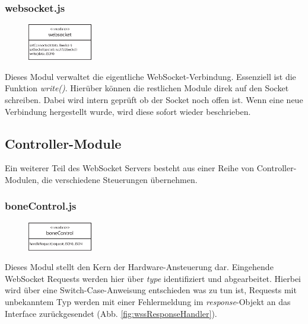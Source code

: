 \subsubsection{websocket.js}
\begin{figure}
  \vspace{-16pt}
  \centering
  \includegraphics[width = 0.25\textwidth]{dokumentation/images/apiWebsocket.eps}
\end{figure}

Dieses Modul verwaltet die eigentliche WebSocket-Verbindung. Essenziell ist die Funktion \textit{write()}. Hierüber können die restlichen Module direk auf den Socket schreiben. Dabei wird intern geprüft ob der Socket noch offen ist. Wenn eine neue Verbindung hergestellt wurde, wird diese sofort wieder beschrieben.


\subsection{Controller-Module}
Ein weiterer Teil des WebSocket Servers besteht aus einer Reihe von Controller-Modulen, die verschiedene Steuerungen übernehmen.

\subsubsection{boneControl.js}
\begin{figure}
  \vspace{-16pt}
  \centering
  \includegraphics[width = 0.25\textwidth]{dokumentation/images/apiBoneControl.eps}
\end{figure}

Dieses Modul stellt den Kern der Hardware-Ansteuerung dar. Eingehende WebSocket Requests werden hier über \textit{type} identifiziert und abgearbeitet. Hierbei wird über eine Switch-Case-Anweisung entschieden was zu tun ist, Requests mit unbekanntem Typ werden mit einer Fehlermeldung im \textit{response}-Objekt an das Interface zurückgesendet (Abb. \ref{fig:wssResponseHandler}).

